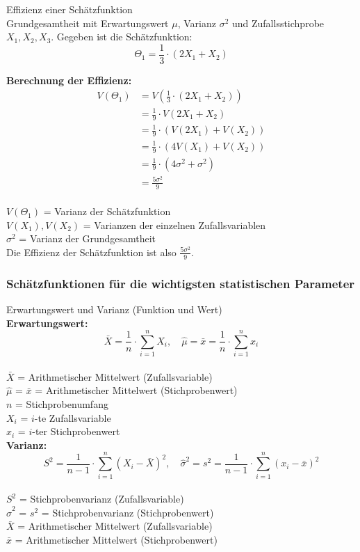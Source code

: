 \begin{example2}{Effizienz einer Schätzfunktion}\\
Grundgesamtheit mit Erwartungswert $\mu$, Varianz $\sigma^2$ und Zufallsstichprobe $X_1, X_2, X_3$. Gegeben ist die Schätzfunktion:
$$
\Theta_1=\frac{1}{3} \cdot(2X_1+X_2)
$$

\textbf{Berechnung der Effizienz:}
$$
\begin{aligned}
V(\Theta_1) &= V(\frac{1}{3} \cdot(2X_1+X_2)) \\
&= \frac{1}{9} \cdot V(2X_1+X_2) \\
&= \frac{1}{9} \cdot (V(2X_1) + V(X_2)) \\
&= \frac{1}{9} \cdot (4V(X_1) + V(X_2)) \\
&= \frac{1}{9} \cdot (4\sigma^2 + \sigma^2) \\
&= \frac{5\sigma^2}{9}
\end{aligned}
$$
\\
$V(\Theta_1)$ = Varianz der Schätzfunktion\\
$V(X_1), V(X_2)$ = Varianzen der einzelnen Zufallsvariablen\\
$\sigma^2$ = Varianz der Grundgesamtheit\\

Die Effizienz der Schätzfunktion ist also $\frac{5\sigma^2}{9}$.
\end{example2}

\subsubsection{Schätzfunktionen für die wichtigsten statistischen Parameter}

\begin{definition}{Erwartungswert und Varianz (Funktion und Wert)}\\
\textbf{Erwartungswert:}
$$
\bar{X}=\frac{1}{n} \cdot \sum_{i=1}^n X_i, \quad \hat{\mu}=\bar{x}=\frac{1}{n} \cdot \sum_{i=1}^n x_i
$$
\\
$\bar{X}$ = Arithmetischer Mittelwert (Zufallsvariable)\\
$\hat{\mu}$ = $\bar{x}$ = Arithmetischer Mittelwert (Stichprobenwert)\\
$n$ = Stichprobenumfang\\
$X_i$ = $i$-te Zufallsvariable\\
$x_i$ = $i$-ter Stichprobenwert\\

\textbf{Varianz:}
$$
S^2=\frac{1}{n-1} \cdot \sum_{i=1}^n (X_i-\bar{X})^2, \quad \hat{\sigma}^2=s^2=\frac{1}{n-1} \cdot \sum_{i=1}^n (x_i-\bar{x})^2
$$
\\
$S^2$ = Stichprobenvarianz (Zufallsvariable)\\
$\hat{\sigma}^2$ = $s^2$ = Stichprobenvarianz (Stichprobenwert)\\
$\bar{X}$ = Arithmetischer Mittelwert (Zufallsvariable)\\
$\bar{x}$ = Arithmetischer Mittelwert (Stichprobenwert)
\end{definition}

